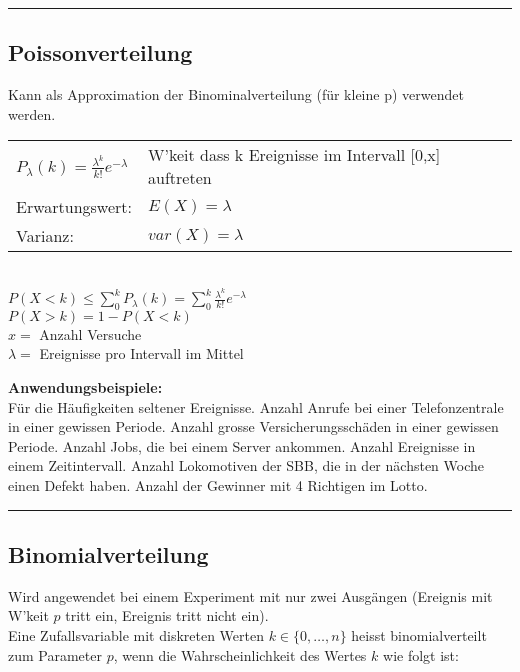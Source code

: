 \hrule \hspace{3mm}

\subsection{Poissonverteilung}
Kann als Approximation der Binominalverteilung (für kleine p) verwendet werden.
	\begin{multicols}{2}
		\begin{tabular}{ll}
        $P_\lambda(k)=\frac{\lambda^k}{k!}e^{-\lambda}$ &
         \parbox{4cm}{W'keit dass k Ereignisse im Intervall [0,x] auftreten} \\
        Erwartungswert:  & $E(X)=\lambda$\\
        Varianz:  & $var(X)=\lambda$ \\
        \end{tabular} \\
         $P(X<k) \leq \sum_0^k P_\lambda(k)=\sum_0^k \frac{\lambda^k}{k!}e^{-\lambda}$ \\
         $P(X>k) = 1-P(X<k)$ \\
        $x =$ Anzahl Versuche\\
        $\lambda =$ Ereignisse pro Intervall im Mittel
        \columnbreak
        
        {\bf Anwendungsbeispiele:} \\ Für die Häufigkeiten seltener
        Ereignisse. Anzahl Anrufe bei einer Telefonzentrale in einer gewissen
        Periode. Anzahl grosse Versicherungsschäden in einer gewissen Periode.
        Anzahl Jobs, die bei einem Server ankommen. Anzahl Ereignisse in
        einem Zeitintervall. Anzahl Lokomotiven der SBB, die in der nächsten Woche 
        einen Defekt haben. Anzahl der Gewinner mit 4 Richtigen im Lotto.
     \end{multicols}
        
\hrule
\subsection{Binomialverteilung}
		
Wird angewendet bei einem Experiment mit nur zwei Ausgängen (Ereignis mit W'keit $p$ tritt
ein, Ereignis tritt nicht ein). \\
Eine Zufallsvariable mit diskreten Werten $k \in \{
0,\ldots,n \}$ heisst binomialverteilt zum Parameter $p$, wenn die
Wahrscheinlichkeit des Wertes $k$ wie folgt ist:


